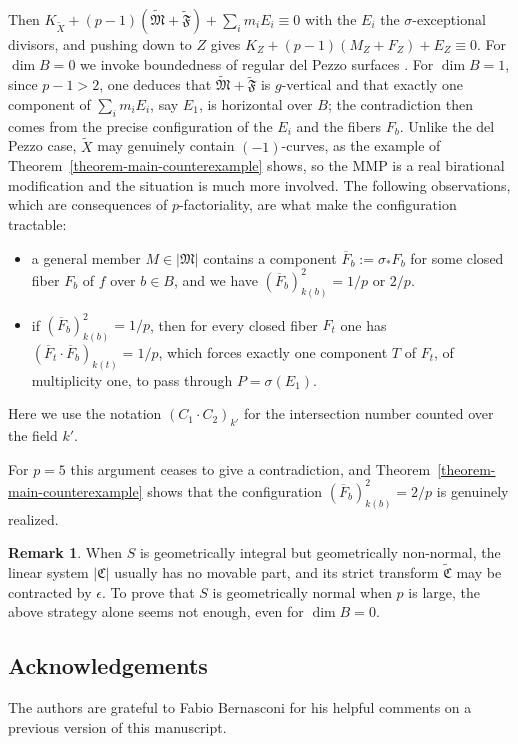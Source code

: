 \documentclass[reqno,oneside]{amsart}
\theoremstyle{definition}
\newtheorem{remark}[theorem]{Remark}
\theoremstyle{plain}
\numberwithin{equation}{section}
\begin{document}
Then $K_{\widetilde{X}} + (p-1) (\widetilde{\mathfrak{M}} + \widetilde{\mathfrak{F}}) + \sum_i m_i E_i \equiv 0$ with the $E_i$ the $\sigma$-exceptional divisors, and pushing down to $Z$ gives $K_Z + (p-1)(M_Z +F_Z) + E_Z \equiv 0$.
For $\dim B = 0$ we invoke boundedness of regular del Pezzo surfaces \cite[Theorem~1.8]{Tanaka-24-Bound}.
For $\dim B = 1$, since $p-1>2$, one deduces that $\widetilde{\mathfrak{M}} + \widetilde{\mathfrak{F}}$ is $g$-vertical and that exactly one component of $\sum_i m_i E_i$, say $E_1$, is horizontal over $B$; the contradiction then comes from the precise configuration of the $E_i$ and the fibers $F_b$.
Unlike the del Pezzo case, $\widetilde X$ may genuinely contain $(-1)$-curves, as the example of Theorem~\ref{theorem-main-counterexample} shows, so the MMP is a real birational modification and the situation is much more involved.
The following observations, which are consequences of $p$-factoriality, are what make the configuration tractable:
\begin{itemize}
  \item a general member $M \in |\mathfrak{M}|$ contains a component $\overline{F}_b:=\sigma_* F_b$ for some closed fiber $F_b$ of $f$ over $b \in B$, and we have $(\overline{F}_b)^2_{k(b)} = 1/p$ or $2/p$.
  \item if $(\overline{F}_b)^2_{k(b)} = 1/p$, then for every closed fiber $F_t$ one has $(\overline{F}_t \cdot \overline{F}_b)_{k(t)} = 1/p$, which forces exactly one component $T$ of $F_t$, of multiplicity one, to pass through $P=\sigma(E_1)$.
\end{itemize}
Here we use the notation $(C_1 \cdot C_2)_{k'}$ for the intersection number counted over the field $k'$.

For $p=5$ this argument ceases to give a contradiction, and Theorem~\ref{theorem-main-counterexample} shows that the configuration $(\overline F_b)^2_{k(b)}=2/p$ is genuinely realized.

\begin{remark}%
  When $S$ is geometrically integral but geometrically non-normal, the linear system $|\mathfrak{C}|$ usually has no movable part, and its strict transform $\widetilde{\mathfrak{C}}$ may be contracted by $\epsilon$. To prove that $S$ is geometrically normal when $p$ is large, the above strategy alone seems not enough, even for $\dim B = 0$.
\end{remark}


\subsection*{Acknowledgements}
The authors are grateful to Fabio Bernasconi for his helpful comments on a previous version of this manuscript.
\end{document}
